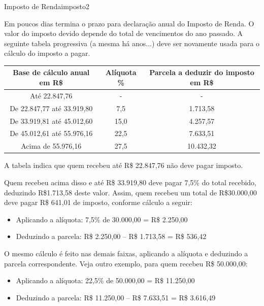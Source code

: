 \documentclass[12pt,a4paper,oneside]{article}
\begin{document}
\begin{problem}{Imposto de Renda}{imposto}{2}

Em poucos dias termina o prazo para declaração anual do Imposto de Renda. O valor do imposto devido depende do total de vencimentos do ano passado. A seguinte tabela progressiva (a mesma há anos...) deve ser novamente usada para o cálculo do imposto a pagar.

\begin{table}[h!]
\centering
\begin{tabular}{ccc}
\hline
Base de cálculo anual em R\$ & Alíquota \% & Parcela a deduzir do imposto em R\$\\
\hline
Até 22.847,76 &- &-\\
De 22.847,77 até 33.919,80 &7,5 &1.713,58\\
De 33.919,81 até 45.012,60 &15,0 &4.257,57\\
De 45.012,61 até 55.976,16 &22,5 &7.633,51\\
Acima de 55.976,16 &27,5 &10.432,32\\
\hline
\end{tabular}
\end{table}

A tabela indica que quem recebeu até R\$ 22.847,76 não deve pagar imposto.

Quem recebeu acima disso e até R\$ 33.919,80 deve pagar 7,5\% do total recebido, deduzindo R\$1.713,58 deste valor. Assim, quem recebeu um total de
R\$30.000,00 deve pagar R\$ 641,01 de imposto, conforme cálculo a seguir:

\vspace{-6pt}
\begin{itemize}
\vspace{-6pt}
\item Aplicando a alíquota: 7,5\% de 30.000,00 = R\$ 2.250,00
\vspace{-6pt}
\item Deduzindo a parcela: R\$ 2.250,00 – R\$ 1.713,58 = R\$ 536,42
\end{itemize}
\vspace{-6pt}

O mesmo cálculo é feito nas demais faixas, aplicando a alíquota e deduzindo a parcela correspondente. Veja outro exemplo, para quem recebeu R\$ 50.000,00:

\vspace{-6pt}
\begin{itemize}
\vspace{-6pt}
\item Aplicando a alíquota: 22,5\% de 50.000,00 = R\$ 11.250,00
\vspace{-6pt}
\item Deduzindo a parcela: R\$ 11.250,00 – R\$ 7.633,51 = R\$ 3.616,49
\end{itemize}
\vspace{-6pt}


\end{problem}
\end{document}
